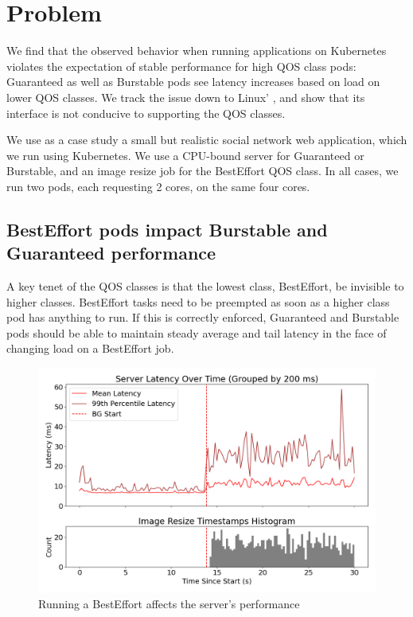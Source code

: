 \section{Problem}\label{s:problem}

We find that the observed behavior when running applications on Kubernetes
violates the expectation of stable performance for high QOS class pods:
Guaranteed as well as Burstable pods see latency increases based on load on
lower QOS classes. We track the issue down to Linux' \cgroups{}, and show that
its interface is not conducive to supporting the QOS classes.

We use as a case study a small but realistic social network web application,
which we run using Kubernetes. We use a CPU-bound server for Guaranteed or
Burstable, and an image resize job for the BestEffort QOS class. In all cases,
we run two pods, each requesting 2 cores, on the same four cores.


\subsection{BestEffort pods impact Burstable and Guaranteed performance}

A key tenet of the QOS classes is that the lowest class, BestEffort, be
invisible to higher classes. BestEffort tasks need to be preempted as soon as a
higher class pod has anything to run. If this is correctly enforced, Guaranteed
and Burstable pods should be able to maintain steady average and tail latency
in the face of changing load on a BestEffort job.


\begin{figure}[t]
    \centering
    \includegraphics[width=\columnwidth]{graphs/kubernetes-unedited.png}
    \caption{Running a BestEffort affects the server's
    performance}\label{fig:kubernetes-unedited}
\end{figure}

